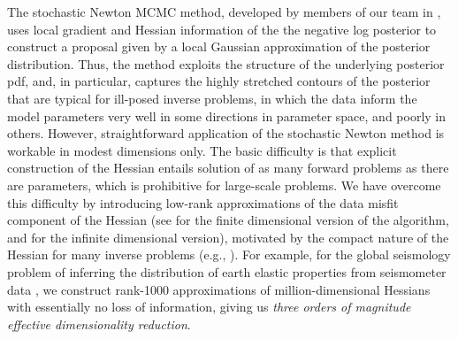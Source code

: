 \documentclass[11pt,final]{article}%
\renewcommand{\citep}{\cite}
\begin{document}
The stochastic Newton MCMC method, developed by members of our team in
\citep{MartinWilcoxBursteddeEtAl12, Bui-ThanhGhattas12d,
  PetraMartinStadlerEtAl13}, uses local gradient and Hessian
information of the the negative log posterior to construct a
proposal given by a local Gaussian approximation of the
posterior distribution. Thus, the method exploits the structure of
the underlying posterior pdf, and, in particular, captures the
highly stretched contours of the posterior that are typical for
ill-posed inverse problems, in which the data inform the model
parameters very well in some directions in parameter space, and poorly
in others. However, straightforward application of the stochastic
Newton method
is workable in modest dimensions only. The basic difficulty is that
explicit construction of the Hessian entails solution of as many
forward problems as there are parameters, which is prohibitive for
large-scale problems. We have overcome this difficulty by introducing
low-rank approximations of the data misfit component of the Hessian (see
\cite{MartinWilcoxBursteddeEtAl12,FlathWilcoxAkcelikEtAl11,
  Bui-ThanhBursteddeGhattasEtAl12_gbfinalist} for the finite
dimensional version of the algorithm, and
\cite{Bui-ThanhGhattasMartinEtAl13, Bui-ThanhGhattas12e} for the
infinite dimensional version), motivated by the compact nature of the
Hessian for many inverse problems (e.g., \cite{Bui-ThanhGhattas12a,
  Bui-ThanhGhattas12, FlathWilcoxAkcelikEtAl11,
  Bui-ThanhBursteddeGhattasEtAl12_gbfinalist,
  Bui-ThanhGhattasMartinEtAl13, MartinWilcoxBursteddeEtAl12,
  Bui-ThanhGhattas12f}). For example, for the global seismology
problem of inferring the distribution of earth elastic properties from
seismometer data \cite{Bui-ThanhGhattasMartinEtAl13,
  Bui-ThanhBursteddeGhattasEtAl12_gbfinalist}, we construct rank-1000
approximations of million-dimensional Hessians with essentially no
loss of information, giving us {\em three orders of magnitude
  effective dimensionality reduction}.
\end{document}
